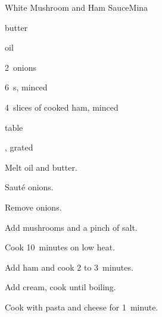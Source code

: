 \begin{recipe}{White Mushroom and Ham Sauce}{Mina}{}

\begin{ingredients}
\item \C{\quarter} butter
\item \C{\half} oil
\item 2~onions
\item 6~s, minced
\item 4~slices of cooked ham, minced
\item {} table 
\item {}, grated
\end{ingredients}

\begin{directions}
\item Melt oil and butter.
\item Saut\'e onions.
\item Remove onions.
\item Add mushrooms and a pinch of salt.
\item Cook 10~minutes on low heat.
\item Add ham and cook 2 to 3~minutes.
\item Add cream, cook until boiling.
\item Cook with pasta and cheese for 1~minute.
\end{directions}

\end{recipe}
